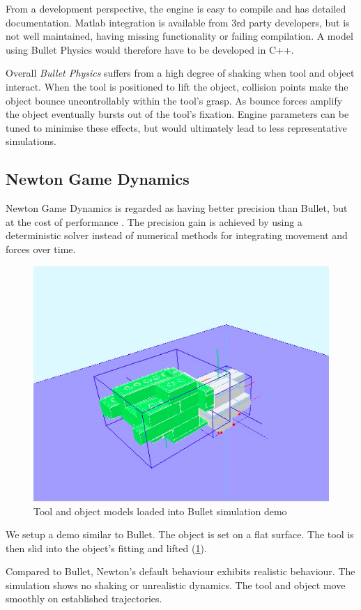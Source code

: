 \documentclass[11]{article}
\begin{document}
From a development perspective, the engine is easy to compile and has detailed documentation.
Matlab integration is available from 3rd party developers, but is not well maintained, having missing functionality or failing compilation.
A model using Bullet Physics would therefore have to be developed in C++. 

Overall \emph{Bullet Physics} suffers from a high degree of shaking when tool and object interact. 
When the tool is positioned to lift the object, collision points make the object bounce uncontrollably within the tool's grasp. 
As bounce forces amplify the object eventually bursts out of the tool's fixation.  
Engine parameters can be tuned to minimise these effects, but would ultimately lead to less representative simulations. 

\subsection{Newton Game Dynamics}
Newton Game Dynamics is regarded as having better precision than Bullet, but at the cost of performance \cite{hummel2012}. 
The precision gain is achieved by using a deterministic solver instead of numerical methods for integrating movement and forces over time. 

\begin{figure}[h]
  \centering
  \includegraphics[width=.5\textwidth]{figures/newton_demo.png}
  \caption{Tool and object models loaded into Bullet simulation demo}
  \label{fig:newton_demo}
\end{figure}      

We setup a demo similar to Bullet.
The object is set on a flat surface. 
The tool is then slid into the object's fitting and lifted (\ref{fig:newton_demo}). 

Compared to Bullet, Newton's default behaviour exhibits realistic behaviour. 
The simulation shows no shaking or unrealistic dynamics.
The tool and object move smoothly on established trajectories. 
\end{document}
